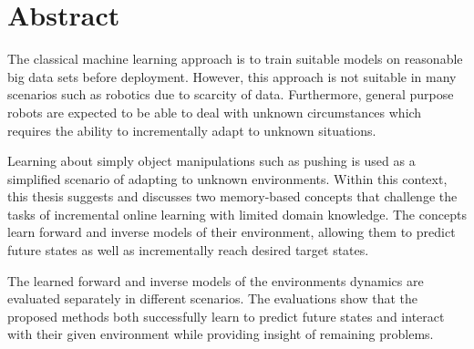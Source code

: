 



\chapter*{\enskip Abstract}

The classical machine learning approach is to train suitable models on reasonable big data sets before deployment. However, this approach is not suitable in many scenarios such as robotics due to scarcity of data. Furthermore, general purpose robots are expected to be able to deal with unknown circumstances which requires the ability to incrementally adapt to unknown situations.

Learning about simply object manipulations such as pushing is used as a simplified scenario of adapting to unknown environments.
Within this context, this thesis suggests and discusses two memory-based concepts that challenge the tasks of incremental online learning with limited domain knowledge.
The concepts learn forward and inverse models of their environment, allowing them to predict future states as well as incrementally reach desired target states.

The learned forward and inverse models of the environments dynamics are evaluated separately in different scenarios.
The evaluations show that the proposed methods both successfully learn to predict future states and interact with their given environment while providing insight of remaining problems.


